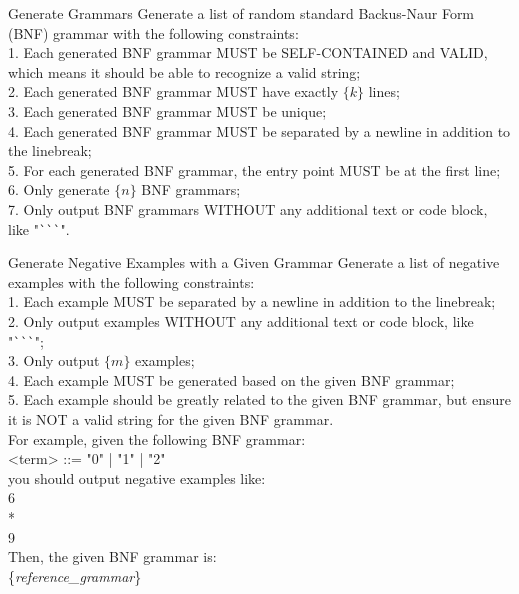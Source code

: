 \begin{promptblock}[t]{Generate Grammars}
\label{prompt:dc_generate_bnfs}
Generate a list of random standard Backus-Naur Form (BNF) grammar with the following constraints:\\
1. Each generated BNF grammar MUST be SELF-CONTAINED and VALID, which means it should be able to recognize a valid string;\\
2. Each generated BNF grammar MUST have exactly $\{k\}$ lines;\\
3. Each generated BNF grammar MUST be unique;\\
4. Each generated BNF grammar MUST be separated by a newline in addition to the linebreak;\\
5. For each generated BNF grammar, the entry point MUST be at the first line;\\
6. Only generate $\{n\}$ BNF grammars;\\
7. Only output BNF grammars WITHOUT any additional text or code block, like "\verb|```|".
\end{promptblock}



\begin{promptblock}{Generate Negative Examples with a Given Grammar}
\label{prompt:dc_generate_nexamples}
Generate a list of negative examples with the following constraints:\\
1. Each example MUST be separated by a newline in addition to the linebreak;\\
2. Only output examples WITHOUT any additional text or code block, like "\verb|```|";\\
3. Only output $\{m\}$ examples;\\
4. Each example MUST be generated based on the given BNF grammar;\\
5. Each example should be greatly related to the given BNF grammar, but ensure it is NOT a valid string for the given BNF grammar.\\

For example, given the following BNF grammar:\\
<term> ::=  "0" | "1" | "2"\\
you should output negative examples like:\\
6\\
\vspace{\baselineskip}
*\\
\vspace{\baselineskip}
9\\
\vspace{\baselineskip}
Then, the given BNF grammar is:\\
\{\textit{reference\_grammar}\}
\end{promptblock}


